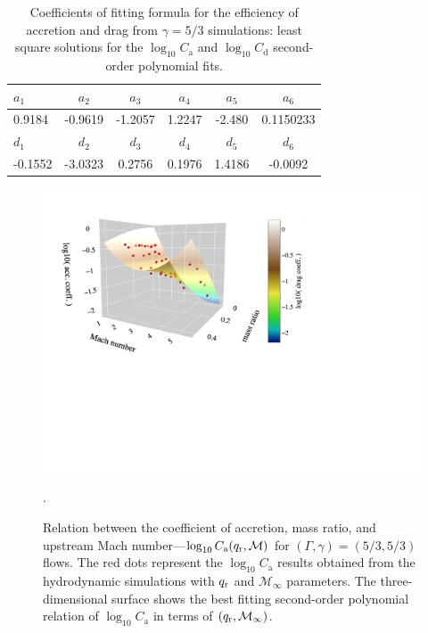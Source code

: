 \begin{table}[h]
\centering\begin{tabular}{lccccc}
\hline\hline
\rule{0pt}{3ex}
$a_1$ & $a_2$ & $a_3$ & $a_4$ & $a_5$ & $a_6$ \\
\hline
\rule{0pt}{3ex}%
\vspace*{0.1cm}
0.9184 & -0.9619 & -1.2057 & 1.2247 & -2.480 & 0.1150233 \\
\hline\hline
\rule{0pt}{3ex}
$d_1$ & $d_2$ & $d_3$ & $d_4$ & $d_5$ & $d_6$ \\
\hline
\rule{0pt}{3ex}%
\vspace*{0.1cm}
-0.1552 & -3.0323 & 0.2756 & 0.1976 & 1.4186 & -0.0092 \\
\hline
\end{tabular}
\caption{Coefficients of fitting formula for the efficiency of accretion and drag from $\gamma = 5/3$ simulations: least square solutions for the $\log_{10} C_{\mathrm a}$ and $\log_{10} C_{\mathrm d}$ second-order polynomial fits.}
\label{tab:sims_53_fits}
\end{table}

\begin{figure}
  \centering
  \includegraphics[width=14cm]{figures/common_envelope/logmdot_order2_g53.pdf}
\caption{Relation between the coefficient of accretion, mass ratio, and upstream Mach number---$\log_{10}C_{\mathrm a} (q_{\rm r}, \mathcal{M})$ for $(\Gamma, \gamma) = (5/3, 5/3)$ flows. The red dots represent the $\log_{10}C_{\mathrm a}$ results obtained from the hydrodynamic simulations with $q_{\rm r}$ and $\mathcal{M}_\infty$ parameters. The three-dimensional surface shows the best fitting second-order polynomial relation of $\log_{10}C_{\mathrm a}$ in terms of $(q_{\rm r}, \mathcal{M}_\infty)$.\label{fig:logmdot_g53}}.
\end{figure}


